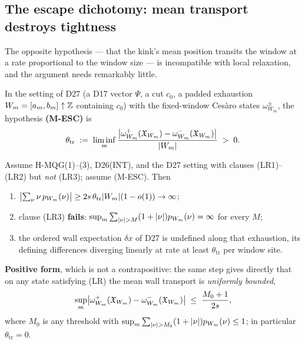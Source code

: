 
\subsection{The escape dichotomy: mean transport destroys tightness}
\label{subsec:escape-dichotomy}

The opposite hypothesis --- that the kink's mean position transits the window
at a rate proportional to the window size --- is incompatible with local
relaxation, and the argument needs remarkably little.

\begin{definition}
\label{def:m-esc}
In the setting of D27 (a D17 vector $\Psi$, a cut $c_0$, a padded exhaustion
$W_m=[a_m,b_m]\uparrow\mathbb{Z}$ containing $c_0$) with the fixed-window Ces\`aro
states $\omega^\pm_{W_m}$, the hypothesis \textbf{(M-ESC)} is
\begin{equation}
  \theta_{\mathrm{tr}}\;:=\;\liminf_m
  \frac{\bigl|\omega^+_{W_m}(\mathfrak{X}_{W_m})
        -\omega^-_{W_m}(\mathfrak{X}_{W_m})\bigr|}{\lvert W_m\rvert}\;>\;0 .
  \label{eq:m-esc}
\end{equation}
\end{definition}

\begin{theorem}
\label{thm:escape-obstruction}
\statusProvedConditional\;
Assume H-MQG(1)--(3), D26(INT), and the D27 setting with clauses (LR1)--(LR2)
but \emph{not} (LR3); assume (M-ESC). Then
\begin{enumerate}
\item[(a)] $\bigl|\sum_\nu\nu\,p_{W_m}(\nu)\bigr|
\ge2s\,\theta_{\mathrm{tr}}\lvert W_m\rvert(1-o(1))\to\infty$;
\item[(b)] clause (LR3) \textbf{fails}:
$\sup_m\sum_{\lvert \nu\rvert>M}(1+\lvert \nu\rvert)p_{W_m}(\nu)=\infty$ for every $M$;
\item[(c)] the ordered wall expectation $\delta x$ of D27 is undefined along
that exhaustion, its defining differences diverging linearly at rate at least
$\theta_{\mathrm{tr}}$ per window site.
\end{enumerate}
\textbf{Positive form}, which is not a contrapositive: the same step gives
directly that on any state satisfying (LR) the mean wall transport is
\emph{uniformly bounded},
\begin{equation}
  \sup_m\bigl|\omega^+_{W_m}(\mathfrak{X}_{W_m})
  -\omega^-_{W_m}(\mathfrak{X}_{W_m})\bigr|\;\le\;\frac{M_0+1}{2s},
  \label{eq:positive-transport-bound}
\end{equation}
where $M_0$ is any threshold with
$\sup_m\sum_{\lvert \nu\rvert>M_0}(1+\lvert \nu\rvert)p_{W_m}(\nu)\le1$; in particular
$\theta_{\mathrm{tr}}=0$.
\end{theorem}


